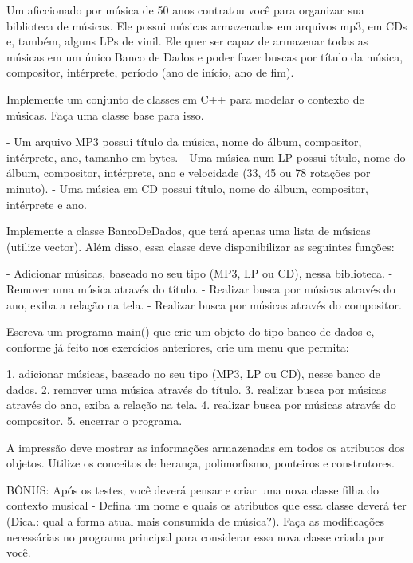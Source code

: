Um aficcionado por música de 50 anos contratou você para organizar sua biblioteca de músicas. Ele possui músicas armazenadas em arquivos mp3, em CDs e, também, alguns LPs de vinil. Ele quer ser capaz de armazenar todas as músicas em um único Banco de Dados  e poder fazer buscas por título da música, compositor, intérprete, período (ano de início, ano de fim).

Implemente um conjunto de classes em C++ para modelar o contexto de músicas. Faça uma classe base para isso.

- Um arquivo MP3 possui título da música, nome do álbum, compositor, intérprete, ano, tamanho em bytes.
- Uma música num LP possui título, nome do álbum, compositor, intérprete, ano e velocidade (33, 45 ou 78 rotações por minuto).
- Uma música em CD possui título, nome do álbum, compositor, intérprete e ano.

Implemente a classe BancoDeDados, que terá apenas uma lista de músicas (utilize vector). Além disso, essa classe deve disponibilizar as seguintes funções:

- Adicionar músicas, baseado no seu tipo (MP3, LP ou CD), nessa biblioteca.
- Remover uma música através do título.
- Realizar busca por músicas através do ano, exiba a relação na tela.
- Realizar busca por músicas através do compositor.

Escreva um programa main() que crie um objeto do tipo banco de dados e, conforme já feito nos exercícios anteriores, crie um menu que permita:

    1. adicionar músicas, baseado no seu tipo (MP3, LP ou CD), nesse banco de dados.
    2. remover uma música através do título.
    3. realizar busca por músicas através do ano, exiba a relação na tela.
    4. realizar busca por músicas através do compositor.
    5. encerrar o programa.
   
A impressão deve mostrar as informações armazenadas em todos os atributos dos objetos. Utilize os conceitos de herança, polimorfismo, ponteiros e construtores.

BÔNUS: Após os testes, você deverá pensar e criar uma nova classe filha do contexto musical - Defina um nome e quais os atributos que essa classe deverá ter (Dica.: qual a forma atual mais consumida de música?). Faça as modificações necessárias no programa principal para considerar essa nova classe criada por você.